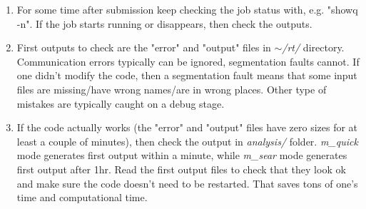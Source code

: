 \documentclass{emulateapj}
\begin{document}
\begin{enumerate}
\item{For some time after submission keep checking the job status with, e.g. "showq -n". If the job starts running or disappears, then check the outputs.}
\item{First outputs to check are the "error" and "output" files in \textit{$\sim$/rt/} directory. Communication errors typically can be ignored, segmentation faults cannot.
If one didn't modify the code, then a segmentation fault means that some input files are missing/have wrong names/are in wrong places.
Other type of mistakes are typically caught on a debug stage.}
\item{If the code actually works (the "error" and "output" files have zero sizes for at least a couple of minutes), then check the output in \textit{analysis/} folder.
\textit{m\_quick} mode generates first output within a minute, while \textit{m\_sear} mode generates first output after 1hr. Read the first output files to check that they look ok
and make sure the code doesn't need to be restarted. That saves tons of one's time and computational time.}
\end{enumerate}
\end{document}
